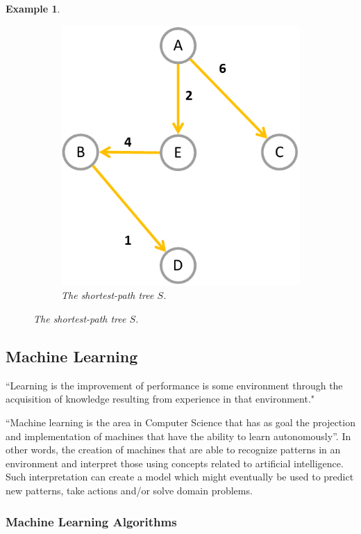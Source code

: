 \documentclass[12pt]{article}
\newtheorem{example}{Example}[section]
\begin{document}
\begin{example}
\begin{figure}[H]
\begin{subfigure}{.4\linewidth}
			\includegraphics[width=\linewidth]{graphs/spa-tree}
			\captionsetup{justification=centering}
			\caption{The shortest-path tree $S$.}
			\label{fig:spa-tree}
		\end{subfigure}
	\end{figure}
\end{example}

\subsection{Machine Learning}
“Learning is the improvement of performance is some environment through the acquisition of knowledge resulting from experience in that environment." \cite{pat1996}

“Machine learning is the area in Computer Science that has as goal the projection and implementation of machines that have the ability to learn autonomously”. \cite{hot2009} In other words, the creation of machines that are able to recognize patterns in an environment and interpret those using concepts related to artificial intelligence. Such interpretation can create a model which might eventually be used to predict new patterns, take actions and/or solve domain problems.

\subsubsection{Machine Learning Algorithms}
\end{document}
